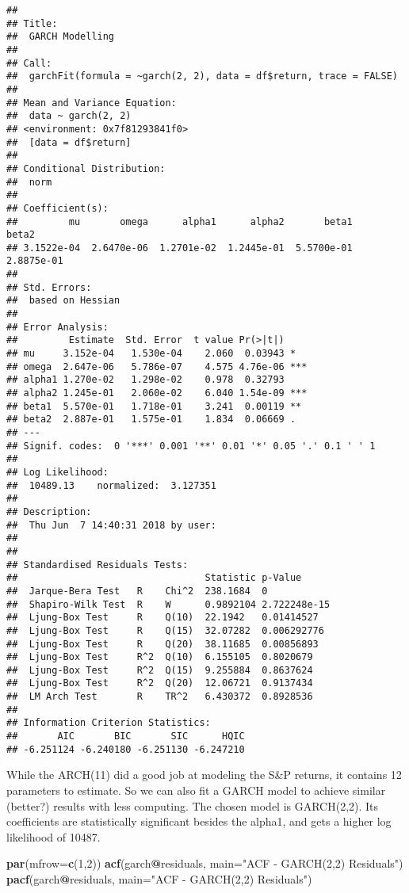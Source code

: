 \documentclass[]{article}
\newenvironment{Shaded}{\begin{snugshade}}{\end{snugshade}}
\newcommand{\KeywordTok}[1]{\textcolor[rgb]{0.13,0.29,0.53}{\textbf{#1}}}
\newcommand{\DataTypeTok}[1]{\textcolor[rgb]{0.13,0.29,0.53}{#1}}
\newcommand{\DecValTok}[1]{\textcolor[rgb]{0.00,0.00,0.81}{#1}}
\newcommand{\StringTok}[1]{\textcolor[rgb]{0.31,0.60,0.02}{#1}}
\newcommand{\OperatorTok}[1]{\textcolor[rgb]{0.81,0.36,0.00}{\textbf{#1}}}
\newcommand{\NormalTok}[1]{#1}
\begin{document}
\begin{verbatim}
## 
## Title:
##  GARCH Modelling 
## 
## Call:
##  garchFit(formula = ~garch(2, 2), data = df$return, trace = FALSE) 
## 
## Mean and Variance Equation:
##  data ~ garch(2, 2)
## <environment: 0x7f81293841f0>
##  [data = df$return]
## 
## Conditional Distribution:
##  norm 
## 
## Coefficient(s):
##         mu       omega      alpha1      alpha2       beta1       beta2  
## 3.1522e-04  2.6470e-06  1.2701e-02  1.2445e-01  5.5700e-01  2.8875e-01  
## 
## Std. Errors:
##  based on Hessian 
## 
## Error Analysis:
##         Estimate  Std. Error  t value Pr(>|t|)    
## mu     3.152e-04   1.530e-04    2.060  0.03943 *  
## omega  2.647e-06   5.786e-07    4.575 4.76e-06 ***
## alpha1 1.270e-02   1.298e-02    0.978  0.32793    
## alpha2 1.245e-01   2.060e-02    6.040 1.54e-09 ***
## beta1  5.570e-01   1.718e-01    3.241  0.00119 ** 
## beta2  2.887e-01   1.575e-01    1.834  0.06669 .  
## ---
## Signif. codes:  0 '***' 0.001 '**' 0.01 '*' 0.05 '.' 0.1 ' ' 1
## 
## Log Likelihood:
##  10489.13    normalized:  3.127351 
## 
## Description:
##  Thu Jun  7 14:40:31 2018 by user:  
## 
## 
## Standardised Residuals Tests:
##                                 Statistic p-Value     
##  Jarque-Bera Test   R    Chi^2  238.1684  0           
##  Shapiro-Wilk Test  R    W      0.9892104 2.722248e-15
##  Ljung-Box Test     R    Q(10)  22.1942   0.01414527  
##  Ljung-Box Test     R    Q(15)  32.07282  0.006292776 
##  Ljung-Box Test     R    Q(20)  38.11685  0.00856893  
##  Ljung-Box Test     R^2  Q(10)  6.155105  0.8020679   
##  Ljung-Box Test     R^2  Q(15)  9.255884  0.8637624   
##  Ljung-Box Test     R^2  Q(20)  12.06721  0.9137434   
##  LM Arch Test       R    TR^2   6.430372  0.8928536   
## 
## Information Criterion Statistics:
##       AIC       BIC       SIC      HQIC 
## -6.251124 -6.240180 -6.251130 -6.247210
\end{verbatim}

While the ARCH(11) did a good job at modeling the S\&P returns, it
contains 12 parameters to estimate. So we can also fit a GARCH model to
achieve similar (better?) results with less computing. The chosen model
is GARCH(2,2). Its coefficients are statistically significant besides
the alpha1, and gets a higher log likelihood of 10487.

\begin{Shaded}
\begin{Highlighting}[]
\KeywordTok{par}\NormalTok{(}\DataTypeTok{mfrow=}\KeywordTok{c}\NormalTok{(}\DecValTok{1}\NormalTok{,}\DecValTok{2}\NormalTok{))}
\KeywordTok{acf}\NormalTok{(garch}\OperatorTok{@}\NormalTok{residuals, }\DataTypeTok{main=}\StringTok{"ACF - GARCH(2,2) Residuals"}\NormalTok{)}
\KeywordTok{pacf}\NormalTok{(garch}\OperatorTok{@}\NormalTok{residuals, }\DataTypeTok{main=}\StringTok{"ACF - GARCH(2,2) Residuals"}\NormalTok{)}
\end{Highlighting}
\end{Shaded}
\end{document}
